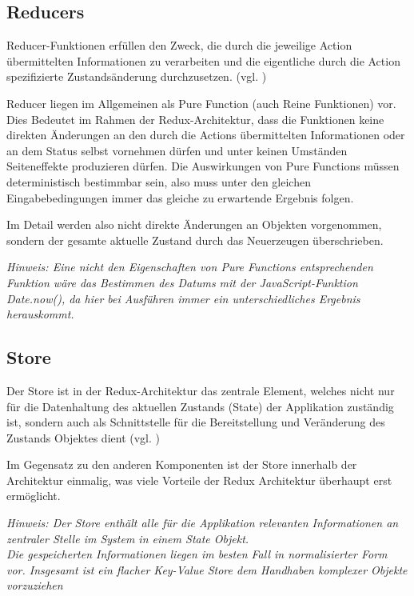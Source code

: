\documentclass[bibliography=totoc,listof=totoc,BCOR=5mm,DIV=12,oneside]{scrbook}
\begin{document}
\subsection{Reducers}
\par Reducer-Funktionen erfüllen den Zweck, die durch die jeweilige Action übermittelten Informationen zu verarbeiten und die eigentliche durch die Action spezifizierte Zustandsänderung durchzusetzen. (vgl. \citep{ReduxReducers})
\par Reducer liegen im Allgemeinen als Pure Function (auch Reine Funktionen) vor. Dies Bedeutet im Rahmen der Redux-Architektur, dass die Funktionen keine direkten Änderungen an den durch die Actions übermittelten Informationen oder an dem Status selbst  vornehmen dürfen und unter keinen Umständen Seiteneffekte produzieren dürfen. Die Auswirkungen von Pure Functions müssen deterministisch bestimmbar sein, also muss unter den gleichen Eingabebedingungen immer das gleiche zu erwartende Ergebnis folgen.
\par Im Detail werden also nicht direkte Änderungen an Objekten vorgenommen, sondern der gesamte aktuelle Zustand durch das Neuerzeugen überschrieben.
\par \bigskip \textit{Hinweis: Eine nicht den Eigenschaften von Pure Functions entsprechenden Funktion wäre das Bestimmen des Datums mit der JavaScript-Funktion Date.now(), da hier bei Ausführen immer ein unterschiedliches Ergebnis herauskommt.}

\subsection{Store}
\par Der Store ist in der Redux-Architektur das zentrale Element, welches nicht nur für die Datenhaltung des aktuellen Zustands (State) der Applikation zuständig ist, sondern auch als Schnittstelle für die Bereitstellung und Veränderung des Zustands Objektes dient (vgl. \citep{ReduxStore})
\par Im Gegensatz zu den anderen Komponenten ist der Store innerhalb der Architektur einmalig, was viele Vorteile der Redux Architektur überhaupt erst ermöglicht.

\par \bigskip \textit{Hinweis: Der Store enthält alle für die Applikation relevanten Informationen an zentraler Stelle im System in einem State Objekt.\\
Die gespeicherten Informationen liegen im besten Fall in normalisierter Form vor. Insgesamt ist ein flacher Key-Value Store dem Handhaben komplexer Objekte vorzuziehen}
\end{document}
